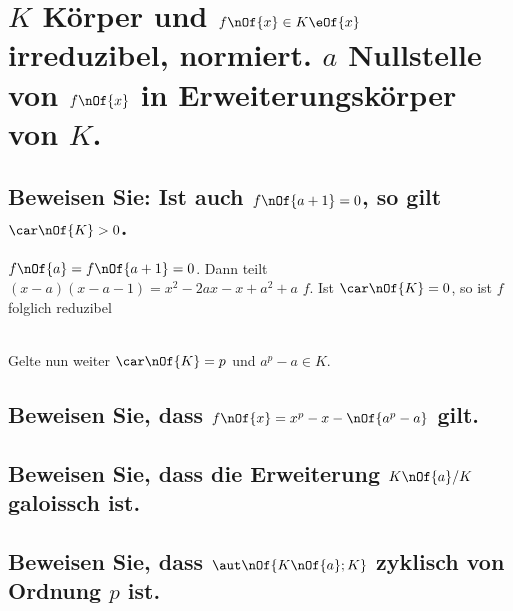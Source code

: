 \section{$K$ Körper und $f\nOf{x}\in K \eOf{x}$ irreduzibel, normiert. $a$ Nullstelle von $f\nOf{x}$ in Erweiterungskörper von $K$.}

\subsection{Beweisen Sie: Ist auch $f\nOf{a + 1} = 0$, so gilt $\car\nOf{K} > 0$.}
$f\nOf{a} = f\nOf{a+1} = 0$. Dann teilt $(x-a)(x-a-1) = x^2-2ax-x+a^2+a$ $f$. Ist $\car\nOf{K} = 0$, so ist $f$ folglich reduzibel

\\ Gelte nun weiter $\car\nOf{K} = p$ und $a^p - a \in K$.
\subsection{Beweisen Sie, dass $f\nOf{x} = x^p - x - \nOf{a^p - a}$ gilt.}

\subsection{Beweisen Sie, dass die Erweiterung $K\nOf{a}/K$ galoissch ist.}

\subsection{Beweisen Sie, dass $\aut\nOf{K\nOf{a};K}$ zyklisch von Ordnung $p$ ist.}
